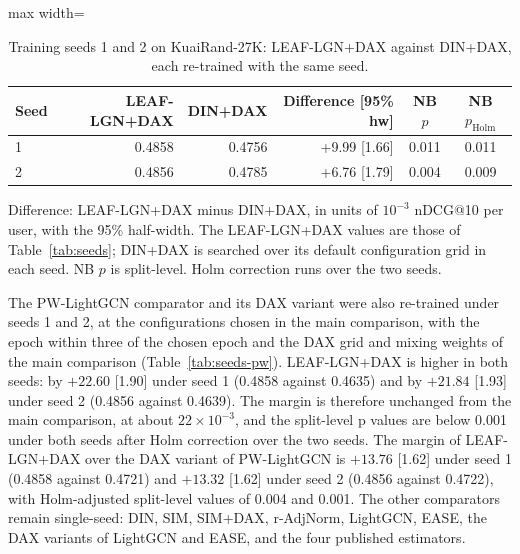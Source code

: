 \documentclass[preprint,12pt,authoryear]{elsarticle}
\begin{document}
\begin{table}[tbp]
\centering
\footnotesize
\caption{Training seeds 1 and 2 on KuaiRand-27K: LEAF-LGN+DAX against DIN+DAX, each re-trained with the same seed.}
\label{tab:seeds-din}
\begin{adjustbox}{max width=\linewidth}
\begin{tabular}{lrrrcc}
\toprule
Seed & LEAF-LGN+DAX & DIN+DAX & Difference [95\% hw] & NB $p$ & NB $p_{\mathrm{Holm}}$ \\
\midrule
1 & 0.4858 & 0.4756 & +9.99 [1.66] & 0.011 & 0.011 \\
2 & 0.4856 & 0.4785 & +6.76 [1.79] & 0.004 & 0.009 \\
\bottomrule
\end{tabular}
\end{adjustbox}
\par\smallskip
\begin{minipage}{\linewidth}\raggedright\footnotesize Difference: LEAF-LGN+DAX minus DIN+DAX, in units of $10^{-3}$ nDCG@10 per user, with the 95\% half-width. The LEAF-LGN+DAX values are those of Table~\ref{tab:seeds}; DIN+DAX is searched over its default configuration grid in each seed. NB $p$ is split-level. Holm correction runs over the two seeds.\end{minipage}
\end{table}


The PW-LightGCN comparator and its DAX variant were also re-trained under seeds 1 and 2, at the configurations chosen in the main comparison, with the epoch within three of the chosen epoch and the DAX grid and mixing weights of the main comparison (Table~\ref{tab:seeds-pw}). LEAF-LGN+DAX is higher in both seeds: by $+22.60$ [1.90] under seed 1 (0.4858 against 0.4635) and by $+21.84$ [1.93] under seed 2 (0.4856 against 0.4639). The margin is therefore unchanged from the main comparison, at about $22\times10^{-3}$, and the split-level p values are below 0.001 under both seeds after Holm correction over the two seeds. The margin of LEAF-LGN+DAX over the DAX variant of PW-LightGCN is $+13.76$ [1.62] under seed 1 (0.4858 against 0.4721) and $+13.32$ [1.62] under seed 2 (0.4856 against 0.4722), with Holm-adjusted split-level values of 0.004 and 0.001. The other comparators remain single-seed: DIN, SIM, SIM+DAX, r-AdjNorm, LightGCN, EASE, the DAX variants of LightGCN and EASE, and the four published estimators.
\end{document}
